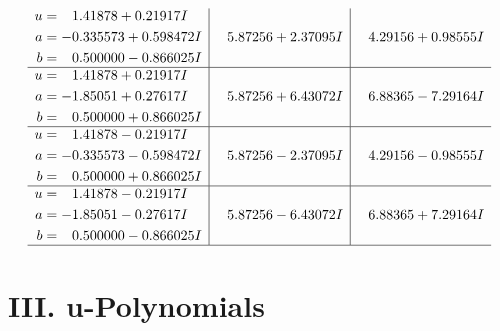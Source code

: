 \documentclass[1p]{elsarticle_modified}
\theoremstyle{definition}
\begin{document}
$$\begin{array}{c|c|c}
\begin{aligned}
u &= \phantom{-}1.41878 + 0.21917 I \\
a &= -0.335573 + 0.598472 I \\
b &= \phantom{-}0.500000 - 0.866025 I\end{aligned}
 & \phantom{-}5.87256 + 2.37095 I & \phantom{-}4.29156 + 0.98555 I \\ \hline\begin{aligned}
u &= \phantom{-}1.41878 + 0.21917 I \\
a &= -1.85051 + 0.27617 I \\
b &= \phantom{-}0.500000 + 0.866025 I\end{aligned}
 & \phantom{-}5.87256 + 6.43072 I & \phantom{-}6.88365 - 7.29164 I \\ \hline\begin{aligned}
u &= \phantom{-}1.41878 - 0.21917 I \\
a &= -0.335573 - 0.598472 I \\
b &= \phantom{-}0.500000 + 0.866025 I\end{aligned}
 & \phantom{-}5.87256 - 2.37095 I & \phantom{-}4.29156 - 0.98555 I \\ \hline\begin{aligned}
u &= \phantom{-}1.41878 - 0.21917 I \\
a &= -1.85051 - 0.27617 I \\
b &= \phantom{-}0.500000 - 0.866025 I\end{aligned}
 & \phantom{-}5.87256 - 6.43072 I & \phantom{-}6.88365 + 7.29164 I\\
 \hline 
 \end{array}$$\newpage
\newpage\renewcommand{\arraystretch}{1}
\centering \section*{ III. u-Polynomials}
\end{document}
